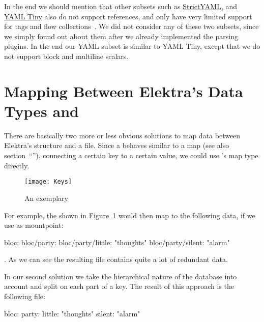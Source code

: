 In the end we should mention that other  subsets such as \href{https://github.com/crdoconnor/strictyaml}{StrictYAML}, and \href{https://metacpan.org/pod/YAML::Tiny}{YAML Tiny} also do not support references, and only have very limited support for tags and flow collections~\cite{connor2018strictyaml, kennedy2018yamltiny}. We did not consider any of these two subsets, since we simply found out about them after we already implemented the parsing plugins. In the end our YAML subset is similar to YAML Tiny, except that we do not support block and multiline scalars.

\section{Mapping Between Elektra’s Data Types and }
\label{sec:mapping_elektra_yaml}

\begin{sloppypar}
  There are basically two more or less obvious solutions to map data between Elektra’s  structure and a  file. Since a  behaves similar to a map (see also section~“”), connecting a certain key to a certain value, we could use ’s map type directly.
\end{sloppypar}

\begin{figure}
  \centering
    \texttt{[image: Keys]}
  \caption{An exemplary }
  \label{fig:keys}
\end{figure}

For example, the  shown in Figure~\ref{fig:keys} would then map to the following  data, if we use  as mountpoint:

\begin{yamlcode}
  bloc:
  bloc/party:
  bloc/party/little: "thoughts"
  bloc/party/silent: "alarm"
\end{yamlcode}

. As we can see the resulting  file contains quite a lot of redundant data.

In our second solution we take the hierarchical nature of the database into account and split on each part of a key. The result of this approach is the following  file:

\begin{yamlcode}
  bloc:
    party:
      little: "thoughts"
      silent: "alarm"
\end{yamlcode}

